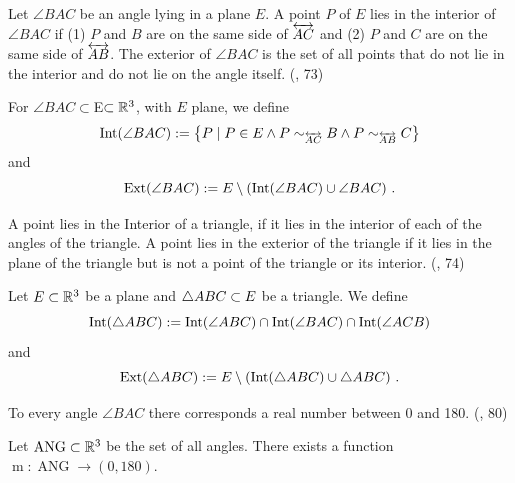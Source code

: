 \begin{definition}\label{def:Angle_Interior}
  Let $\angle BAC$ be an angle lying in a plane $E$.
  A point $P$ of $E$ lies in the interior of $\angle{BAC}$ if
  (1) $P$ and $B$ are on the same side of $\overleftrightarrow{AC}$ and
  (2) $P$ and $C$ are on the same side of $\overleftrightarrow{AB}$.
  The exterior of $\angle{BAC}$ is the set of all points that do not lie in the interior and do not lie on the angle itself.
  (\cite{SMSGGeometry}, 73)

  For $\angle{BAC} \subset $E$ \subset \mathbb{R}^3$, with $E$ plane, we define
  \[
  \operatorname{Int}({\angle{BAC}}):=\left\{ P\mid P \in E \land P \sim_{\overleftrightarrow{AC}} B \land P \sim_{\overleftrightarrow{AB}} C \right\}
  \]
  and
  \[
  \operatorname{Ext}({\angle{BAC}}):=E\setminus\left(\operatorname{Int}({\angle{BAC}})\cup \angle{BAC}\right) \, \text{.}
  \]
\end{definition}

\begin{definition}\label{def:Tiangle_Interior}
  A point lies in the Interior of a triangle, if it lies in the interior of each of the angles of the triangle.
  A point lies in the exterior of the triangle if it lies in the plane of the triangle but is not a point of the triangle or its interior.
  (\cite{SMSGGeometry}, 74)

  Let $E \subset \mathbb{R}^3$ be a plane and $\bigtriangleup{ABC}\subset E$ be a triangle.
  We define
  \[
  \operatorname{Int}({\bigtriangleup{ABC}}):=\operatorname{Int}({\angle{ABC}})\cap \operatorname{Int}({\angle{BAC}})\cap \operatorname{Int}({\angle{ACB}})
  \]
  and
  \[
  \operatorname{Ext}({\bigtriangleup{ABC}}):=E\setminus\left(\operatorname{Int}({\bigtriangleup{ABC}})\cup \bigtriangleup{ABC}\right)\, \text{.}
  \]
\end{definition}

\begin{definition}\label{def:Postulate_11}
  To every angle $\angle{BAC}$ there corresponds a real number between 0 and 180.
  (\cite{SMSGGeometry}, 80)

  Let $\operatorname{ANG}\subset \mathbb{R}^3$ be the set of all angles.
  There exists a function $\operatorname{m}:\operatorname{ANG}\to (0,180)$.
\end{definition}

